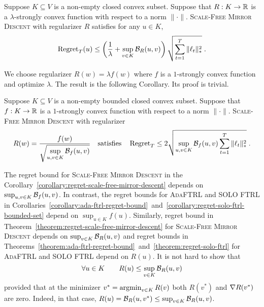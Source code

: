\begin{theorem}
\label{theorem:regret-scale-free-mirror-descent}
Suppose $K \subseteq V$ is a non-empty closed convex subset. Suppose that $R:K
\to \mathbb{R}$ is a $\lambda$-strongly convex function with respect to a norm
$\|\cdot\|$.  \textsc{Scale-Free Mirror Descent} with regularizer $R$ satisfies
for any $u \in K$,
$$
\operatorname{Regret}_T(u) \le \left( \frac{1}{\lambda} + \sup_{v \in K} \mathcal{B}_R(u,v) \right) \sqrt{\sum_{t=1}^T \|\ell_t\|_*^2} \; .
$$
\end{theorem}

We choose regularizer $R(w) = \lambda f(w)$ where $f$ is a $1$-strongly convex
function and optimize $\lambda$. The result is the following Corollary. Its proof is trivial.

\begin{corollary}
\label{corollary:regret-scale-free-mirror-descent}
Suppose $K \subseteq V$ is a non-empty bounded closed convex subset.  Suppose
that $f:K \to \mathbb{R}$ is a $1$-strongly convex function with respect to a norm
$\|\cdot\|$.  \textsc{Scale-Free Mirror Descent} with regularizer
$$
R(w) = \frac{f(w)}{\displaystyle \sqrt{\sup_{u,v \in K} \Breg_f(u,v)}}
\quad \text{satisfies} \quad %
\Regret_T \le 2 \sqrt{\sup_{u,v \in K} \Breg_f(u,v) \sum_{t=1}^T \|\ell_t\|_*^2} \; .
$$
\end{corollary}

The regret bound for \textsc{Scale-Free Mirror Descent}
in the Corollary~\ref{corollary:regret-scale-free-mirror-descent}
depends on $\sup_{u,v \in K} \mathcal{B}_f(u,v)$. In contrast,
the regret bounds for \textsc{AdaFTRL} and \textsc{SOLO FTRL}
in Corollaries~\ref{corollary:ada-ftrl-regret-bound}~and~\ref{corollary:regret-solo-ftrl-bounded-set}
depend on $\sup_{u \in K} f(u)$.
Similarly, regret bound in Theorem~\ref{theorem:regret-scale-free-mirror-descent} for
\textsc{Scale-Free Mirror Descent} depends on $\sup_{v \in K} \mathcal{B}_R(u,v)$ and
regret bounds in Theorems~\ref{theorem:ada-ftrl-regret-bound}~and~\ref{theorem:regret-solo-ftrl}
for \textsc{AdaFTRL} and \textsc{SOLO FTRL} depend on $R(u)$. It is not hard to show that
\begin{equation}
\label{equation:regularizer-vs-divergence}
\forall u \in K \qquad R(u) \le \sup_{v \in K} \mathcal{B}_R(u,v)
\end{equation}
provided that at the minimizer $v^* = \operatorname*{argmin}_{v \in K} R(v)$ both $R(v^*)$ and
$\nabla R(v^*)$ are zero. Indeed, in that case, $R(u) = \mathcal{B}_R(u,v^*) \le
\sup_{v \in K} \mathcal{B}_R(u,v)$.

